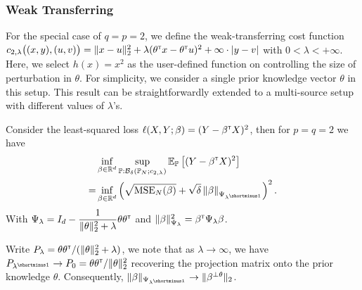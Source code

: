 \documentclass[12pt]{article}
\begin{document}
\subsubsection{Weak Transferring}
For the special case of $q=p=2$, we define the weak-transferring cost function $c_{2,\lambda}\big((x,y),(u,v) \big) = \Vert x-u\Vert_2^2 + \lambda (\theta^{\scriptscriptstyle \sf T} x - \theta^{\scriptscriptstyle \sf T} u)^2 + \infty \cdot |y-v|$ with $0<\lambda<+\infty$. Here, we select $h(x) = x^2$ as the user-defined function on controlling the size of perturbation in $\theta$.  For simplicity, we consider a single prior knowledge vector $\theta$ in this setup. This result can be straightforwardly extended to a multi-source setup with different values of $\lambda$'s.

\begin{theorem}
\label{thm:weak_l2}
    Consider the least-squared loss $\ell(X,Y;\beta) = (Y-\beta^{\scriptscriptstyle \sf T} X)^2$, then for $p=q=2$ we have \begin{align*}&\inf_{\beta\in\mathbb{R}^d} \sup_{\mathbb{P}:\mathcal{B}_\delta(\mathbb{P}_N;c_{2,\lambda})} \mathbb{E}_{\mathbb{P}}\left[(Y-\beta\trans X)^2\right]\\
        =&
    \inf_{\beta\in\mathbb{R}^d} \left(\sqrt{{\rm MSE}_N(\beta)} + \sqrt{\delta} \left\Vert \beta \right\Vert_{\Psi_{\lambda^{\shortminus 1}}} \right)^2.
    \end{align*}With $\Psi_\lambda = I_d - \dfrac{1}{ \Vert \theta\Vert_2^2 + \lambda}\theta \theta^{\scriptscriptstyle \sf T}$ and $\Vert \beta \Vert_{\Psi_\lambda}^2 = \beta^{\scriptscriptstyle \sf T} \Psi_\lambda \beta$.
\end{theorem}

Write $P_\lambda = {\theta\theta^{\scriptscriptstyle \sf T}}/({\lVert\theta\Vert_2^2+\lambda})$, we note that as $\lambda\to\infty$, we have $P_{\lambda^{\shortminus 1}} \to P_0 = {\theta\theta\trans}/{\Vert\theta\Vert_2^2}$ recovering the projection matrix onto the prior knowledge $\theta$. Consequently, $\Vert\beta\Vert_{\Psi_{\lambda^{\shortminus 1}}} \to \Vert \beta^{\perp\theta}\Vert_2$.
\end{document}
